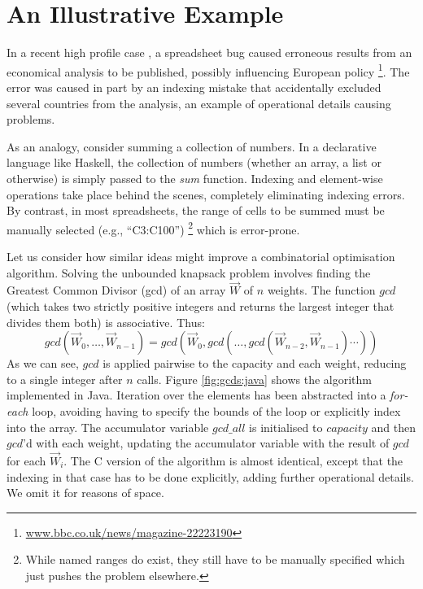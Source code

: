 \section{An Illustrative Example}

In a recent high profile case \cite{Herndon13}, a spreadsheet bug caused
erroneous results from an economical analysis to be published, possibly
influencing European policy%
\footnote{\url{www.bbc.co.uk/news/magazine-22223190}}.
The error was caused in part by an indexing mistake that accidentally excluded
several countries from the analysis, an example of operational details causing
problems.

As an analogy, consider summing a collection of numbers. In a declarative
language like Haskell, the collection of numbers (whether an array, a list or
otherwise) is simply passed to the \emph{sum} function. Indexing and
element-wise operations take place behind the scenes, completely eliminating
indexing errors. By contrast, in most spreadsheets, the range of cells to
be summed must be manually selected (e.g., ``C3:C100'')%
\footnote{While named ranges do exist, they still have to be manually specified
which just pushes the problem elsewhere.} which is error-prone.

Let us consider how similar ideas might improve a combinatorial
optimisation algorithm. Solving the unbounded knapsack problem involves
finding the Greatest Common Divisor (gcd) of an array $\vec{W}$ of $n$
weights. The function $gcd$ (which takes two strictly positive integers and returns the
largest integer that divides them both) is associative. Thus:
\[
gcd (\vec{W}_0, \ldots, \vec{W}_{n-1}) =
gcd(\vec{W}_0,gcd(\ldots,gcd (\vec{W}_{n-2},\vec{W}_{n-1})\cdots))
\]
As we can see, $gcd$ is applied pairwise to the capacity and each weight,
reducing to a single integer after $n$ calls. Figure \ref{fig:gcds:java} shows
the algorithm implemented in Java. Iteration over the elements has been
abstracted into a \emph{for-each} loop, avoiding having to specify the bounds
of the loop or explicitly index into the array. The accumulator variable $gcd\_all$ is initialised to
$capacity$ and then $gcd$'d with each weight, updating the accumulator
variable with the result of $gcd$ for each $\vec{W}_i$. The C version of
the algorithm is almost identical, except that the indexing in that case has
to be done explicitly, adding further operational details. We omit it for
reasons of space.

